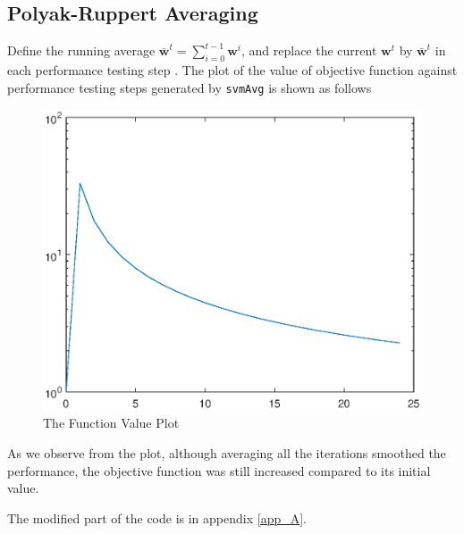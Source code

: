 \documentclass[10pt]{article}
\begin{document}
\subsection{Polyak-Ruppert Averaging}
Define the running average $\bar{\mathbf{w}}^t = \sum\limits_{i=0}^{t-1}\mathbf{w}^i$, and replace the current $\mathbf{w}^t$ by $\bar{\mathbf{w}}^t$ in each performance testing step \cite{polyak1992acceleration}. The plot of the value of objective function against performance testing steps generated by \texttt{svmAvg} is shown as follows
\begin{figure}[H]
\centering
\includegraphics[scale=.65]{bonus1.eps}
\caption{The Function Value Plot}
\label{bonus1}
\end{figure}
As we observe from the plot, although averaging all the iterations smoothed the performance, the objective function was still increased compared to its initial value.\par
The modified part of the code is in appendix \ref{app_A}.
\end{document}
